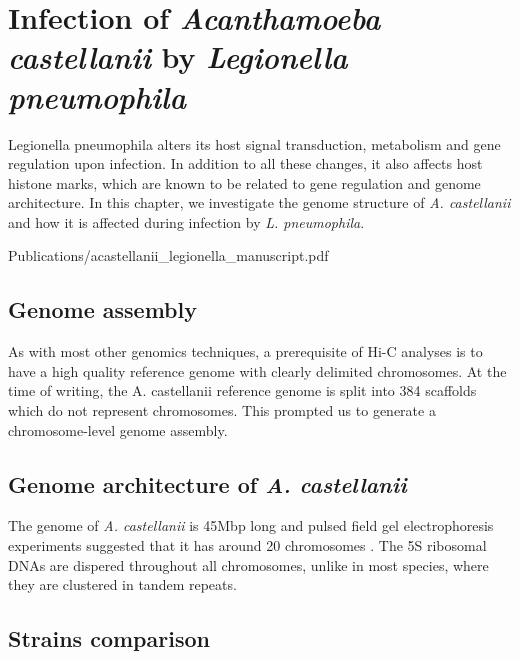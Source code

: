 
\chapter{Infection of \textit{Acanthamoeba castellanii} by \textit{Legionella pneumophila}} %

\label{ch:02-02} %


Legionella pneumophila alters its host signal transduction, metabolism and gene regulation upon infection. In addition to all these changes, it also affects host histone marks, which are known to be related to gene regulation and genome architecture. In this chapter, we investigate the genome structure of \textit{A. castellanii} and how it is affected during infection by \textit{L. pneumophila}.



     {Publications/acastellanii_legionella_manuscript.pdf}    

\section{Genome assembly}

As with most other genomics techniques, a prerequisite of Hi-C analyses is to have a high quality reference genome with clearly delimited chromosomes. At the time of writing, the A. castellanii reference genome is split into 384 scaffolds which do not represent chromosomes. This prompted us to generate a chromosome-level genome assembly.

\section{Genome architecture of \textit{A. castellanii}}

The genome of \textit{A. castellanii} is 45Mbp long and pulsed field gel electrophoresis experiments suggested that it has around 20 chromosomes \cite{rimmResolutionAcanthamoebaCastellanii1988}. The 5S ribosomal DNAs are dispered throughout all chromosomes, unlike in most species, where they are clustered in tandem repeats.

\section{Strains comparison}

